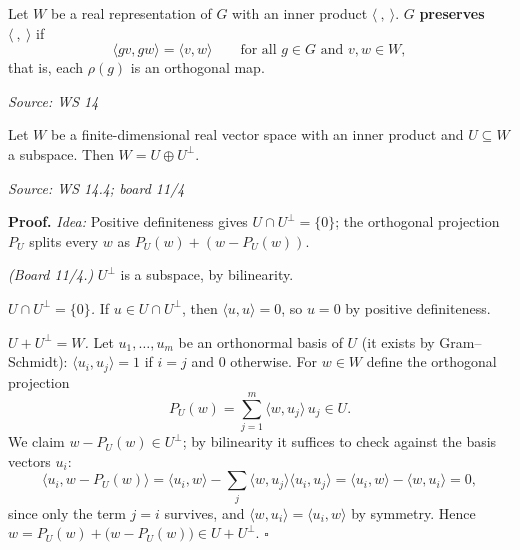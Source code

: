 \documentclass[11pt]{report}
\renewenvironment{proof}[1][Proof]{\noindent\textbf{#1.} }{\hfill$\square$\par\vspace{5pt}}
\newcommand{\srcline}[1]{\par\hfill{\footnotesize\textit{Source: #1}}}
\begin{document}
\begin{defbox}\label{def:preserves-inner-product}
Let $W$ be a real representation of $G$ with an inner product $\langle\ ,\ \rangle$. $G$ \textbf{preserves} $\langle\ ,\ \rangle$ if
\[ \langle gv, gw \rangle = \langle v, w \rangle \qquad \text{for all } g \in G \text{ and } v, w \in W, \]
that is, each $\rho(g)$ is an orthogonal map.
\srcline{WS 14}
\end{defbox}

\begin{propbox}\label{prop:orthogonal-complement-direct-sum}
Let $W$ be a finite-dimensional real vector space with an inner product and $U \subseteq W$ a subspace. Then $W = U \oplus U^\perp$.
\srcline{WS 14.4; board 11/4}
\end{propbox}

\begin{proof}
\textit{Idea:} Positive definiteness gives $U \cap U^\perp = \{0\}$; the orthogonal projection $P_U$ splits every $w$ as $P_U(w) + (w - P_U(w))$.\par
\textit{(Board 11/4.)} $U^\perp$ is a subspace, by bilinearity.

\emph{$U \cap U^\perp = \{0\}$.} If $u \in U \cap U^\perp$, then $\langle u, u \rangle = 0$, so $u = 0$ by positive definiteness.

\emph{$U + U^\perp = W$.} Let $u_1, \ldots, u_m$ be an orthonormal basis of $U$ (it exists by Gram--Schmidt): $\langle u_i, u_j \rangle = 1$ if $i = j$ and $0$ otherwise. For $w \in W$ define the orthogonal projection
\[ P_U(w) = \sum_{j=1}^m \langle w, u_j \rangle\, u_j \in U. \]
We claim $w - P_U(w) \in U^\perp$; by bilinearity it suffices to check against the basis vectors $u_i$:
\[ \langle u_i, w - P_U(w) \rangle = \langle u_i, w \rangle - \sum_j \langle w, u_j \rangle \langle u_i, u_j \rangle = \langle u_i, w \rangle - \langle w, u_i \rangle = 0, \]
since only the term $j = i$ survives, and $\langle w, u_i \rangle = \langle u_i, w \rangle$ by symmetry. Hence $w = P_U(w) + \big(w - P_U(w)\big) \in U + U^\perp$.
\end{proof}
\end{document}
